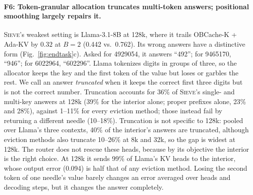 \documentclass{article}
\newcommand{\sieve}{\textsc{Sieve}}
\theoremstyle{definition}
\begin{document}
\paragraph{F6: Token-granular allocation truncates multi-token answers; positional smoothing largely repairs it.}
\sieve{}'s weakest setting is Llama-3.1-8B at 128k, where it trails OBCache-K + Ada-KV by $0.32$ at $B=2$ (0.442 vs.\ 0.762).  Its wrong answers have a distinctive form (Fig.~\ref{fig:endtask}c).  Asked for 4929054, it answers ``492''; for 9465170, ``946''; for 6022964, ``602296''.  Llama tokenizes digits in groups of three, so the allocator keeps the key and the first token of the value but loses or garbles the rest.  We call an answer \emph{truncated} when it keeps the correct first three digits but is not the correct number.  Truncation accounts for 36\% of \sieve{}'s single- and multi-key answers at 128k (39\% for the interior alone; proper prefixes alone, 23\% and 28\%), against 1--11\% for every eviction method; those instead fail by returning a different needle (10--18\%).  Truncation is not specific to 128k: pooled over Llama's three contexts, 40\% of the interior's answers are truncated, although eviction methods also truncate 10--26\% at 8k and 32k, so the gap is widest at 128k.  The router does not rescue these heads, because by its objective the interior is the right choice.  At 128k it sends 99\% of Llama's KV heads to the interior, whose output error (0.094) is half that of any eviction method.  Losing the second token of one needle's value barely changes an error averaged over heads and decoding steps, but it changes the answer completely.
\end{document}
